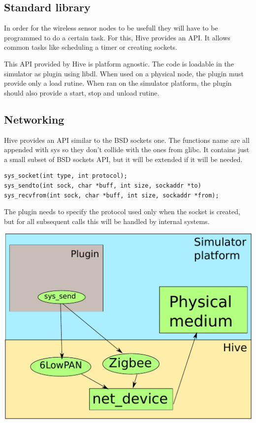 
\subsection{Standard library}

In order for the wireless sensor nodes to be usefull they will have to be
programmed to do a certain task. For this, Hive provides an API. It allows
common tasks like scheduling a timer or creating sockets. 

This API provided by Hive is platform agnostic. The code is loadable in the
simulator as plugin using libdl. When used on a physical node, the plugin must
provide only a load rutine. When ran on the simulator platform, the plugin
should also provide a start, stop and unload rutine.

\subsection{Networking}

Hive provides an API similar to the BSD sockets one. The functions name are
all appended with sys so they don't collide with the ones from glibc. It
contains just a small subset of BSD sockets API, but it will be extended if
it will be needed.
\begin{lstlisting}
sys_socket(int type, int protocol);
sys_sendto(int sock, char *buff, int size, sockaddr *to)
sys_recvfrom(int sock, char *buff, int size, sockaddr *from);
\end{lstlisting}
The plugin needs to specify the protocol used only when the socket is created,
but for all subsequent calls this will be handled by internal systems. 

\includegraphics[scale=0.75]{img/networking.pdf}

